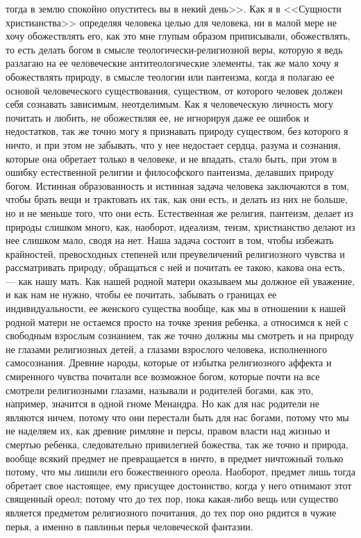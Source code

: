 \documentclass[12pt]{article}
\begin{document}
тогда в землю спокойно опуститесь вы в некий день>>. Как я в <<Сущности христианства>>  определяя человека целью для человека, ни в малой мере не хочу обожествлять его, как это мне глупым образом приписывали, обожествлять, то есть делать богом в смысле теологически-религиозной веры, которую я ведь разлагаю на ее человеческие антитеологические элементы, так же мало хочу я обожествлять природу, в смысле теологии или пантеизма, когда я полагаю ее основой человеческого существования, существом, от которого человек должен себя сознавать зависимым, неотделимым. Как я человеческую личность могу почитать и любить, не обожествляя ее, не игнорируя даже ее ошибок и недостатков, так же точно могу я признавать природу существом, без которого я ничто, и при этом не забывать, что у нее недостает сердца, разума и сознания, которые она обретает только в человеке, и не впадать, стало быть, при этом в ошибку естественной религии и философского пантеизма, делавших природу богом. Истинная образованность и истинная задача человека заключаются в том, чтобы брать вещи и трактовать их так, как они есть, и делать из них не больше, но и не меньше того, что они есть. Естественная же религия, пантеизм, делает из природы слишком много, как, наоборот, идеализм, теизм, христианство делают из нее слишком мало, сводя на нет. Наша задача состоит в том, чтобы избежать крайностей, превосходных степеней или преувеличений религиозного чувства и рассматривать природу, обращаться с ней и почитать ее такою, какова она есть, --- как нашу мать. Как нашей родной матери оказываем мы должное ей уважение, и как нам не нужно, чтобы ее почитать, забывать о границах ее индивидуальности, ее женского существа вообще, как мы в отношении к нашей родной матери не остаемся просто на точке зрения ребенка, а относимся к ней с свободным взрослым сознанием, так же точно должны мы смотреть и на природу не глазами религиозных детей, а глазами взрослого человека, исполненного самосознания. Древние народы, которые от избытка религиозного аффекта и смиренного чувства почитали все возможное богом, которые почти на все смотрели религиозными глазами, называли и родителей богами, как это, например, значится в одной гноме Менандра. Но как для нас родители не являются ничем, потому что они перестали быть для нас богами, потому что мы не наделяем их, как древние римляне и персы, правом власти над жизнью и смертью ребенка, следовательно привилегией божества, так же точно и природа, вообще всякий предмет не превращается в ничто, в предмет ничтожный только потому, что мы лишили его божественного ореола. Наоборот, предмет лишь тогда обретает свое настоящее, ему присущее достоинство, когда у него отнимают этот священный ореол; потому что до тех пор, пока какая-либо вещь или существо является предметом религиозного почитания, до тех пор оно рядится в чужие перья, а именно в павлиньи перья человеческой фантазии. 
\end{document}
